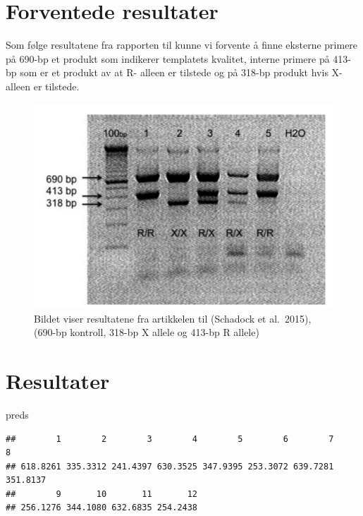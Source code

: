 \documentclass[
]{book}
\newenvironment{Shaded}{\begin{snugshade}}{\end{snugshade}}
\newcommand{\NormalTok}[1]{#1}
\begin{document}
\hypertarget{forventede-resultater}{%
\section{Forventede resultater}\label{forventede-resultater}}

Som følge resultatene fra rapporten til \citet{schadock2015} kunne vi forvente å finne eksterne primere på 690-bp et produkt som indikerer templatets kvalitet, interne primere på 413- bp som er et produkt av at R- alleen er tilstede og på 318-bp produkt hvis X- alleen er tilstede.

\begin{figure}
\centering
\includegraphics{images/forventede resultater.png}
\caption{Bildet viser resultatene fra artikkelen til (Schadock et al.~2015), (690-bp kontroll, 318-bp X allele og 413-bp R allele)}
\end{figure}

\hypertarget{resultater-1}{%
\section{Resultater}\label{resultater-1}}

\begin{Shaded}
\begin{Highlighting}[]
\NormalTok{preds }
\end{Highlighting}
\end{Shaded}

\begin{verbatim}
##        1        2        3        4        5        6        7        8 
## 618.8261 335.3312 241.4397 630.3525 347.9395 253.3072 639.7281 351.8137 
##        9       10       11       12 
## 256.1276 344.1080 632.6835 254.2438
\end{verbatim}
\end{document}
